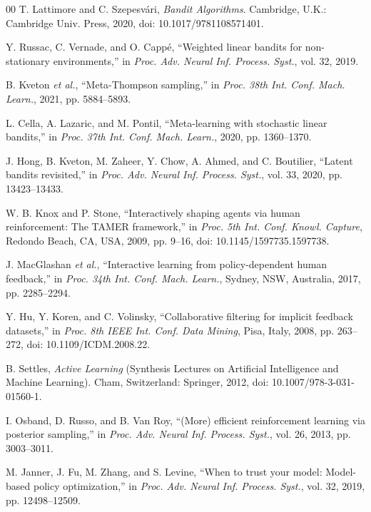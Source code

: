 \documentclass{ieeeaccess}
\begin{document}
\begin{thebibliography}{00}
 T. Lattimore and C. Szepesv\'{a}ri, \emph{Bandit Algorithms}. Cambridge, U.K.: Cambridge Univ. Press, 2020, doi: 10.1017/9781108571401.

 Y. Russac, C. Vernade, and O. Capp\'{e}, ``Weighted linear bandits for non-stationary environments,'' in \emph{Proc. Adv. Neural Inf. Process. Syst.}, vol. 32, 2019.

 B. Kveton \emph{et al.}, ``Meta-Thompson sampling,'' in \emph{Proc. 38th Int. Conf. Mach. Learn.}, 2021, pp. 5884--5893.

 L. Cella, A. Lazaric, and M. Pontil, ``Meta-learning with stochastic linear bandits,'' in \emph{Proc. 37th Int. Conf. Mach. Learn.}, 2020, pp. 1360--1370.

 J. Hong, B. Kveton, M. Zaheer, Y. Chow, A. Ahmed, and C. Boutilier, ``Latent bandits revisited,'' in \emph{Proc. Adv. Neural Inf. Process. Syst.}, vol. 33, 2020, pp. 13423--13433.

 W. B. Knox and P. Stone, ``Interactively shaping agents via human reinforcement: The TAMER framework,'' in \emph{Proc. 5th Int. Conf. Knowl. Capture}, Redondo Beach, CA, USA, 2009, pp. 9--16, doi: 10.1145/1597735.1597738.

 J. MacGlashan \emph{et al.}, ``Interactive learning from policy-dependent human feedback,'' in \emph{Proc. 34th Int. Conf. Mach. Learn.}, Sydney, NSW, Australia, 2017, pp. 2285--2294.

 Y. Hu, Y. Koren, and C. Volinsky, ``Collaborative filtering for implicit feedback datasets,'' in \emph{Proc. 8th IEEE Int. Conf. Data Mining}, Pisa, Italy, 2008, pp. 263--272, doi: 10.1109/ICDM.2008.22.

 B. Settles, \emph{Active Learning} (Synthesis Lectures on Artificial Intelligence and Machine Learning). Cham, Switzerland: Springer, 2012, doi: 10.1007/978-3-031-01560-1.

 I. Osband, D. Russo, and B. Van Roy, ``(More) efficient reinforcement learning via posterior sampling,'' in \emph{Proc. Adv. Neural Inf. Process. Syst.}, vol. 26, 2013, pp. 3003--3011.

 M. Janner, J. Fu, M. Zhang, and S. Levine, ``When to trust your model: Model-based policy optimization,'' in \emph{Proc. Adv. Neural Inf. Process. Syst.}, vol. 32, 2019, pp. 12498--12509.


\end{thebibliography}
\end{document}

